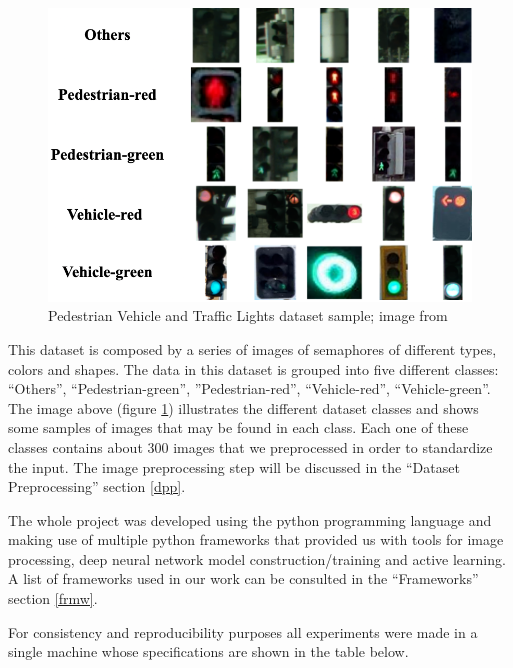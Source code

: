 \documentclass[journal, a4paper]{IEEEtran}
\begin{document}
\begin{figure}[htpb]
    \centering
    \includegraphics[scale=0.28]{PVTL-Preview}
    \caption[PVTLD]{Pedestrian Vehicle and Traffic Lights dataset sample; 
                    image from \parencite{PVTL}}
    \label{pvtld}
\end{figure}

This dataset is composed by a series of images of semaphores of different types, colors 
and shapes. The data in this dataset is grouped into five different classes:
``Others'', ``Pedestrian-green'', ''Pedestrian-red'', ``Vehicle-red'', ``Vehicle-green''.
The image above (figure \ref{pvtld}) illustrates the different dataset classes and shows 
some samples of images that may be found in each class. Each one of these classes contains about 
300 images that we preprocessed in order to standardize the input. The image preprocessing step 
will be discussed in the ``Dataset Preprocessing'' section \ref{dpp}.

The whole project was developed using the python programming language and making use 
of multiple python frameworks that provided us with tools for image processing, deep neural network
model construction/training and active learning. A list of frameworks used in our work can 
be consulted in the ``Frameworks'' section \ref{frmw}.

For consistency and reproducibility purposes all experiments were made in a single machine 
whose specifications are shown in the table below.

\begin{table}[h]
    \label{tab:1}
    \caption{Benchmark Machine specifications.}
    \centering
\end{table}
\end{document}

